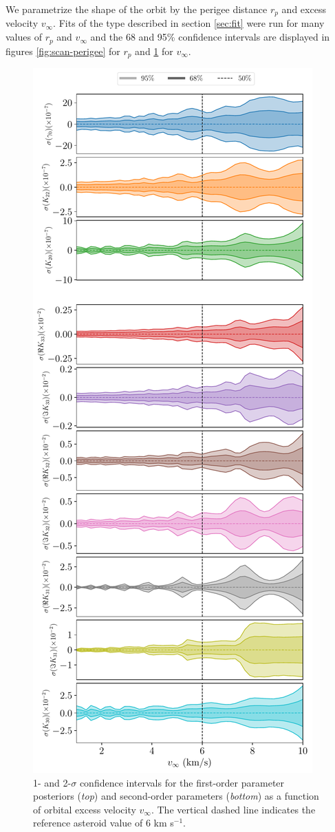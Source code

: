 \documentclass[fleqn,usenatbib]{mnras}
\begin{document}
We parametrize the shape of the orbit by the perigee distance $r_p$ and excess velocity $v_\infty$. Fits of the type described in section \ref{sec:fit} were run for many values of $r_p$ and $v_\infty$ and the 68 and 95\% confidence intervals are displayed in figures \ref{fig:scan-perigee} for $r_p$ and \ref{fig:scan-vex} for $v_\infty$.



\begin{figure}
  \centering
  \includegraphics[height=0.89\textheight]{figs/scan-vex.pdf}
  \caption{1- and 2-$\sigma$ confidence intervals for the first-order parameter posteriors (\textit{top}) and second-order parameters (\textit{bottom}) as a function of orbital excess velocity $v_\infty$. The vertical dashed line indicates the reference asteroid value of 6 km s$^{-1}$.}
  \label{fig:scan-vex}
\end{figure}
\end{document}
